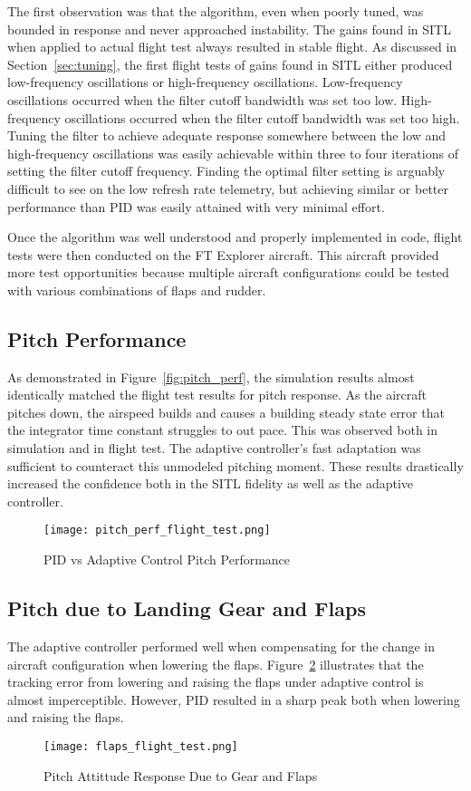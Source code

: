 The first observation was that the algorithm, even when poorly tuned, was bounded in response and never approached instability.  The gains found in \ac{SITL} when applied to actual flight test always resulted in stable flight.  As discussed in Section~\ref{sec:tuning}, the first flight tests of gains found in \ac{SITL} either produced low-frequency oscillations or high-frequency oscillations.  Low-frequency oscillations occurred when the \Lone filter cutoff bandwidth was set too low.  High-frequency oscillations occurred when the \Lone filter cutoff bandwidth was set too high.  Tuning the filter to achieve adequate response somewhere between the low and high-frequency oscillations was easily achievable within three to four iterations of setting the filter cutoff frequency.  Finding the optimal filter setting is arguably difficult to see on the low refresh rate telemetry, but achieving similar or better performance than \ac{PID} was easily attained with very minimal effort.

Once the algorithm was well understood and properly implemented in code, flight tests were then conducted on the FT Explorer aircraft.  This aircraft provided more test opportunities because multiple aircraft configurations could be tested with various combinations of flaps and rudder.  

\subsection{Pitch Performance}
As demonstrated in Figure~\ref{fig:pitch_perf}, the simulation results almost identically matched the flight test results for pitch response.  As the aircraft pitches down, the airspeed builds and causes a building steady state error that the integrator time constant struggles to out pace.  This was observed both in simulation and in flight test.  The \Lone adaptive controller's fast adaptation was sufficient to counteract this unmodeled pitching moment.  These results drastically increased the confidence both in the \ac{SITL} fidelity as well as the \Lone adaptive controller.
\begin{figure}[h!]
 \centering
  \texttt{[image: pitch\_perf\_flight\_test.png]}
  \caption{PID vs \Lone Adaptive Control Pitch Performance}
  \label{fig:pitch_perf_flight_test}
\end{figure}

\subsection{Pitch due to Landing Gear and Flaps}
The \Lone adaptive controller performed well when compensating for the change in aircraft configuration when lowering the flaps.  Figure~\ref{fig:flaps_flight_test} illustrates that the tracking error from lowering and raising the flaps under adaptive control is almost imperceptible.  However, \ac{PID} resulted in a sharp peak both when lowering and raising the flaps.
\begin{figure}[h!]
 \centering
  \texttt{[image: flaps\_flight\_test.png]}
  \caption{Pitch Attittude Response Due to Gear and Flaps}
  \label{fig:flaps_flight_test}
\end{figure}

